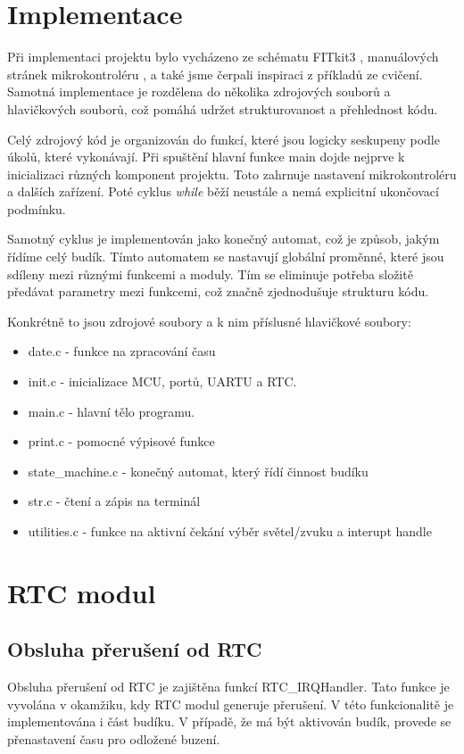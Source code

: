 \documentclass[a4paper, 11pt]{article}
\begin{document}
    \section{Implementace}

Při implementaci projektu bylo vycházeno ze schématu FITkit3 \cite{MAN}, manuálových stránek mikrokontroléru \cite{SCH}, a také jsme čerpali inspiraci z příkladů ze cvičení. Samotná implementace je rozdělena do několika zdrojových souborů a hlavičkových souborů, což pomáhá udržet strukturovanost a přehlednost kódu.

Celý zdrojový kód je organizován do funkcí, které jsou logicky seskupeny podle úkolů, které vykonávají. Při spuštění hlavní funkce main dojde nejprve k inicializaci různých komponent projektu. Toto zahrnuje nastavení mikrokontroléru a dalších zařízení. Poté cyklus \textit{while} běží neustále a nemá explicitní ukončovací podmínku.

Samotný cyklus je implementován jako konečný automat, což je způsob, jakým řídíme celý budík. Tímto automatem se nastavují globální proměnné, které jsou sdíleny mezi různými funkcemi a moduly. Tím se eliminuje potřeba složitě předávat parametry mezi funkcemi, což značně zjednodušuje strukturu kódu.

    Konkrétně to jsou zdrojové soubory a k nim příslusné hlavičkové soubory:

    \begin{itemize}
        \item date.c - funkce na zpracování času
        \item init.c - inicializace MCU, portů, UARTU a RTC.
        \item main.c - hlavní tělo programu.
        \item print.c - pomocné výpisové funkce
        \item state\_machine.c - konečný automat, který řídí činnost budíku
        \item str.c - čtení a zápis na terminál
        \item utilities.c - funkce na aktivní čekání výběr světel/zvuku a interupt handle 
    \end{itemize}

    \section{RTC modul}
        \subsection{Obsluha přerušení od RTC}
        Obsluha přerušení od RTC je zajištěna funkcí RTC\_IRQHandler. Tato funkce je vyvolána v okamžiku, kdy RTC modul generuje přerušení. V této funkcionalitě je implementována i část budíku. V případě, že má být aktivován budík, provede se přenastavení času pro odložené buzení.
    
\end{document}
